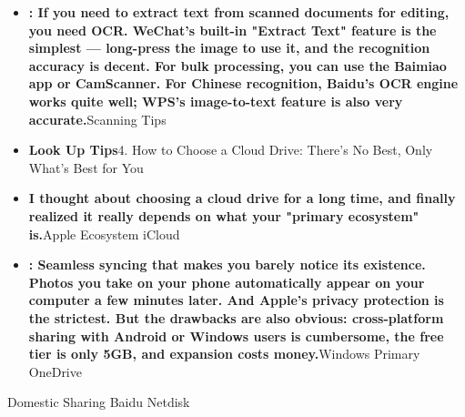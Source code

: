 \begin{itemize}
  \item \textbf{: If you need to extract text from scanned documents for editing, you need OCR. WeChat's built-in "Extract Text" feature is the simplest — long-press the image to use it, and the recognition accuracy is decent. For bulk processing, you can use the Baimiao app or CamScanner. For Chinese recognition, Baidu's OCR engine works quite well; WPS's image-to-text feature is also very accurate.}Scanning Tips
  \item \textbf{Look Up Tips}4. How to Choose a Cloud Drive: There's No Best, Only What's Best for You
  \item \textbf{I thought about choosing a cloud drive for a long time, and finally realized it really depends on what your "primary ecosystem" is.}Apple Ecosystem iCloud
  \item \textbf{: Seamless syncing that makes you barely notice its existence. Photos you take on your phone automatically appear on your computer a few minutes later. And Apple's privacy protection is the strictest. But the drawbacks are also obvious: cross-platform sharing with Android or Windows users is cumbersome, the free tier is only 5GB, and expansion costs money.}Windows Primary OneDrive
\end{itemize}


Domestic Sharing Baidu Netdisk

